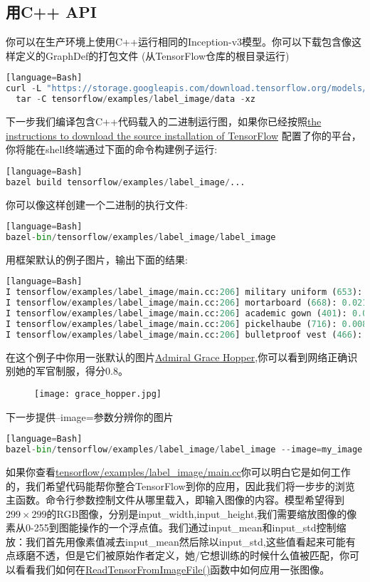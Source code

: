 \subsection{用C++ API}
你可以在生产环境上使用C++运行相同的Inception-v3模型。你可以下载包含像这样定义的GraphDef的打包文件
(从TensorFlow仓库的根目录运行)
\begin{lstlisting}[language=Python][language=Bash]
curl -L "https://storage.googleapis.com/download.tensorflow.org/models/inception_v3_2016_08_28_frozen.pb.tar.gz" |
  tar -C tensorflow/examples/label_image/data -xz
\end{lstlisting}
下一步我们编译包含C++代码载入的二进制运行图，如果你已经按照\href{https://www.tensorflow.org/install/install_sources}{the instructions to download the source installation of TensorFlow}
配置了你的平台，你将能在shell终端通过下面的命令构建例子运行:
\begin{lstlisting}[language=Python][language=Bash]
bazel build tensorflow/examples/label_image/...
\end{lstlisting}
你可以像这样创建一个二进制的执行文件:
\begin{lstlisting}[language=Python][language=Bash]
bazel-bin/tensorflow/examples/label_image/label_image
\end{lstlisting}
用框架默认的例子图片，输出下面的结果:
\begin{lstlisting}[language=Python][language=Bash]
I tensorflow/examples/label_image/main.cc:206] military uniform (653): 0.834306
I tensorflow/examples/label_image/main.cc:206] mortarboard (668): 0.0218692
I tensorflow/examples/label_image/main.cc:206] academic gown (401): 0.0103579
I tensorflow/examples/label_image/main.cc:206] pickelhaube (716): 0.00800814
I tensorflow/examples/label_image/main.cc:206] bulletproof vest (466): 0.00535088
\end{lstlisting}
在这个例子中你用一张默认的图片\href{https://en.wikipedia.org/wiki/Grace_Hopper}{Admiral Grace Hopper},你可以看到网络正确识别她的军官制服，得分0.8。
\begin{center}
\begin{figure}[H]
\texttt{[image: grace\_hopper.jpg]}
\end{figure}
\end{center}
下一步提供--image=参数分辨你的图片
\begin{lstlisting}[language=Python][language=Bash]
bazel-bin/tensorflow/examples/label_image/label_image --image=my_image.png
\end{lstlisting}
如果你查看\href{https://github.com/tensorflow/tensorflow/blob/master/tensorflow/examples/label_image/main.cc}{tensorflow/examples/label\_image/main.cc}你可以明白它是如何工作的，我们希望代码能帮你整合TensorFlow到你的应用，因此我们将一步步的浏览主函数。命令行参数控制文件从哪里载入，即输入图像的内容。模型希望得到$299\times299$的RGB图像，分别是input\_width,input\_height,我们需要缩放图像的像素从0-255到图能操作的一个浮点值。我们通过input\_mean和input\_std控制缩放：我们首先用像素值减去input\_mean然后除以input\_std,这些值看起来可能有点琢磨不透，但是它们被原始作者定义，她/它想训练的时候什么值被匹配，你可以看看我们如何在\href{https://github.com/tensorflow/tensorflow/blob/master/tensorflow/examples/label_image/main.cc#L88}{ReadTensorFromImageFile()}函数中如何应用一张图像。
